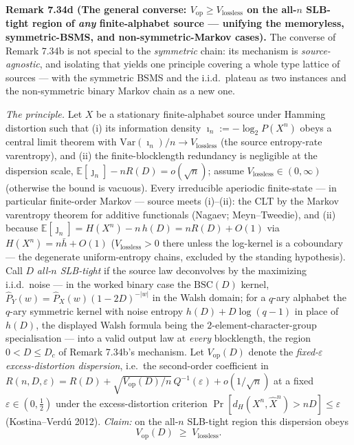 \documentclass[
]{article}
\begin{document}
\textbf{Remark 7.34d (The general converse: $V_{\mathrm{op}}\ge V_{\mathrm{lossless}}$ on the all-$n$
SLB-tight region of \emph{any} finite-alphabet source --- unifying the memoryless, symmetric-BSMS, and
non-symmetric-Markov cases).} The converse of Remark 7.34b is not special to the \emph{symmetric}
chain: its mechanism is \emph{source-agnostic}, and isolating that yields one principle covering a
whole type lattice of sources --- with the symmetric BSMS and the i.i.d.\ plateau as two instances and
the non-symmetric binary Markov chain as a new one.

\emph{The principle.} Let $X$ be a stationary finite-alphabet source under Hamming distortion such that
(i) its information density $\imath_n:=-\log_2 P(X^n)$ obeys a central limit theorem with
$\mathrm{Var}(\imath_n)/n\to V_{\mathrm{lossless}}$ (the source entropy-rate varentropy), and (ii) the
finite-blocklength redundancy is negligible at the dispersion scale,
$\mathbb E[\jmath_n]-nR(D)=o(\sqrt n)$; assume $V_{\mathrm{lossless}}\in(0,\infty)$ (otherwise the bound
is vacuous). Every irreducible aperiodic finite-state --- in particular finite-order Markov --- source
meets (i)--(ii): the CLT by the Markov varentropy theorem for additive functionals (Nagaev;
Meyn--Tweedie), and (ii) because $\mathbb E[\jmath_n]=H(X^n)-n\,h(D)=nR(D)+O(1)$ via $H(X^n)=n\bar h+O(1)$
($V_{\mathrm{lossless}}>0$ there unless the log-kernel is a coboundary --- the degenerate
uniform-entropy chains, excluded by the standing hypothesis). Call $D$ \emph{all-$n$
SLB-tight} if the source law deconvolves by the maximizing i.i.d.\ noise --- in the worked binary case
the $\mathrm{BSC}(D)$ kernel, $\widehat P_Y(w)=\widehat P_X(w)(1-2D)^{-|w|}$ in the Walsh domain; for a
$q$-ary alphabet the $q$-ary symmetric kernel with noise entropy $h(D)+D\log(q-1)$ in place of $h(D)$,
the displayed Walsh formula being the $2$-element-character-group specialisation --- into a valid output
law at \emph{every} blocklength, the region $0<D\le D_c$ of Remark 7.34b's mechanism. Let
$V_{\mathrm{op}}(D)$ denote the \emph{fixed-$\varepsilon$ excess-distortion dispersion}, i.e.\ the
second-order coefficient in $R(n,D,\varepsilon)=R(D)+\sqrt{V_{\mathrm{op}}(D)/n}\,Q^{-1}(\varepsilon)+o(1/\sqrt n)$
at a fixed $\varepsilon\in(0,\tfrac12)$ under the excess-distortion criterion
$\Pr[d_H(X^n,\hat X^n)>nD]\le\varepsilon$ (Kostina--Verd\'u 2012). \emph{Claim:} on the all-$n$
SLB-tight region this dispersion obeys
\[
  V_{\mathrm{op}}(D)\;\ge\;V_{\mathrm{lossless}}.
\]
\end{document}
